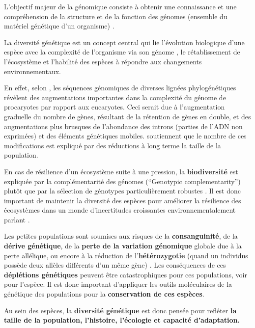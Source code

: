 \documentclass[a4paper,11pt,twoside]{report}
\begin{document}
L'objectif majeur de la génomique consiste à obtenir une connaissance et une compréhension de la structure et de la fonction des génomes (ensemble du matériel génétique d'un organisme) \citep{eggen2003approches}.

La diversité génétique est un concept central qui lie l'évolution biologique d'une espèce avec la complexité de l'organisme via son génome \citep{lynch2003origins}, le rétablissement de l'écosystème \citep{reusch2005ecosystem} et l'habilité des espèces à répondre aux changements environnementaux\citep{o1994role}.

En effet, selon \citet{lynch2003origins}, les séquences génomiques de diverses lignées phylogénétiques révèlent des augmentations importantes dans la complexité du génome de procaryotes par rapport aux eucaryotes. Ceci serait due à l'augmentation graduelle du nombre de gènes, résultant de la rétention de gènes en double, et des augmentations plus brusques de l'abondance des introns (parties de l'ADN non exprimées) et des éléments génétiques mobiles. \citep{lynch2003origins} soutiennent que le nombre de ces modifications est expliqué par des réductions à long terme la taille de la population.

En cas de résilience d'un écosystème suite à une pression, la \textbf{biodiversité} est expliquée par la complémentarité des génomes (``Genotypic complementarity'') plutôt que par la sélection de génotypes particulièrement robustes \citep{reusch2005ecosystem}. Il est donc important de maintenir la diversité des espèces pour améliorer la résilience des écosystèmes dans un monde d'incertitudes croissantes environnementalement parlant \citep{reusch2005ecosystem}.

Les petites populations sont soumises aux risques de la \textbf{consanguinité}, de la \textbf{dérive génétique}, de la \textbf{perte de la variation génomique} globale due à la perte allélique, ou encore à la réduction de l'\textbf{hétérozygotie} (quand un individus possède deux allèles différents d'un même gène) \citep{o1994role}. Les conséquences de ces \textbf{déplétions génétiques} \citep{o1994role} peuvent être catastrophiques pour ces populations, voir pour l'espèce. Il est donc important d'appliquer les outils moléculaires de la génétique des populations pour la \textbf{conservation de ces espèces}.

Au sein des espèces, la \textbf{diversité génétique} est donc pensée pour refléter \textbf{la taille de la population, l'histoire, l'écologie et capacité d'adaptation.} 
\end{document}
